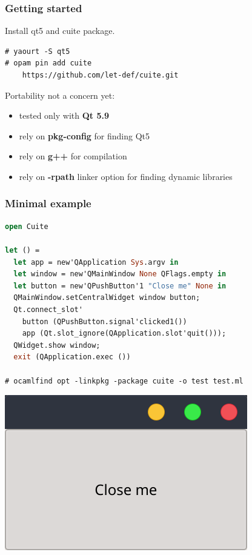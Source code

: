 \documentclass[serif,mathserif]{beamer}
\begin{document}
\begin{frame}[fragile]
  \frametitle{Getting started}

  Install qt5 and cuite package.

\begin{lstlisting}[]
# yaourt -S qt5
# opam pin add cuite 
    https://github.com/let-def/cuite.git
\end{lstlisting}

\pause
  Portability not a concern yet:

  \begin{itemize}
    \item tested only with {\bf Qt 5.9}
    \item rely on {\bf pkg-config} for finding Qt5
    \item rely on {\bf g++} for compilation
    \item rely on {\bf -rpath} linker option for finding dynamic libraries
  \end{itemize}
\end{frame}

\begin{frame}[fragile]
  \frametitle{Minimal example}

  \begin{lstlisting}[language=Caml,morekeywords={module,sig,end,val,new,open}]
open Cuite

let () =
  let app = new'QApplication Sys.argv in
  let window = new'QMainWindow None QFlags.empty in
  let button = new'QPushButton'1 "Close me" None in
  QMainWindow.setCentralWidget window button;
  Qt.connect_slot'
    button (QPushButton.signal'clicked1())
    app (Qt.slot_ignore(QApplication.slot'quit()));
  QWidget.show window;
  exit (QApplication.exec ())

# ocamlfind opt -linkpkg -package cuite -o test test.ml
  \end{lstlisting}

\end{frame}

\begin{frame}
  \includegraphics[width=\textwidth]{closeme}
\end{frame}
\end{document}
